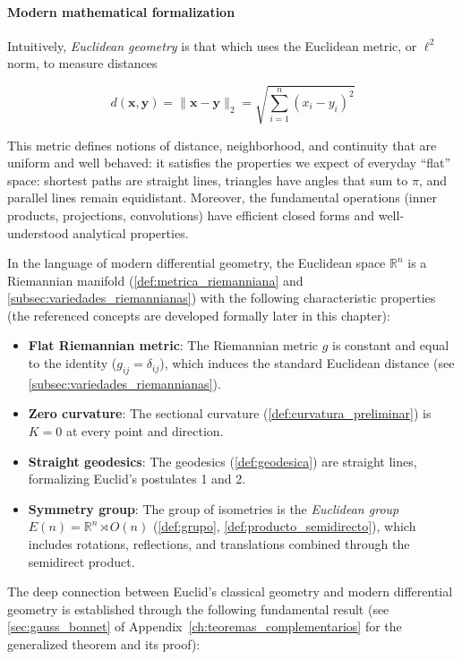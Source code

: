 \paragraph{Modern mathematical formalization}

Intuitively, \textit{Euclidean geometry} is that which uses the Euclidean metric, or $\ell^2$ norm, to measure distances

\[
d(\mathbf{x}, \mathbf{y}) = \|\mathbf{x} - \mathbf{y}\|_2 = \sqrt{\sum_{i=1}^n (x_i - y_i)^2}
\]

This metric defines notions of distance, neighborhood, and continuity that are uniform and well behaved: it satisfies the properties we expect of everyday ``flat'' space: shortest paths are straight lines, triangles have angles that sum to $\pi$, and parallel lines remain equidistant. Moreover, the fundamental operations (inner products, projections, convolutions) have efficient closed forms and well-understood analytical properties.

In the language of modern differential geometry, the Euclidean space $\mathbb{R}^n$ is a Riemannian manifold (\autoref{def:metrica_riemanniana} and \autoref{subsec:variedades_riemannianas}) with the following characteristic properties (the referenced concepts are developed formally later in this chapter):

\begin{itemize}
    \item \textbf{Flat Riemannian metric}: The Riemannian metric $g$ is constant and equal to the identity ($g_{ij} = \delta_{ij}$), which induces the standard Euclidean distance (see \autoref{subsec:variedades_riemannianas}).
    \item \textbf{Zero curvature}: The sectional curvature (\autoref{def:curvatura_preliminar}) is $K = 0$ at every point and direction.
    \item \textbf{Straight geodesics}: The geodesics (\autoref{def:geodesica}) are straight lines, formalizing Euclid's postulates 1 and 2.
    \item \textbf{Symmetry group}: The group of isometries is the \textit{Euclidean group} $E(n) = \mathbb{R}^n \rtimes O(n)$ (\autoref{def:grupo}, \autoref{def:producto_semidirecto}), which includes rotations, reflections, and translations combined through the semidirect product.
\end{itemize}

The deep connection between Euclid's classical geometry and modern differential geometry is established through the following fundamental result (see \autoref{sec:gauss_bonnet} of Appendix~\ref{ch:teoremas_complementarios} for the generalized theorem and its proof):


